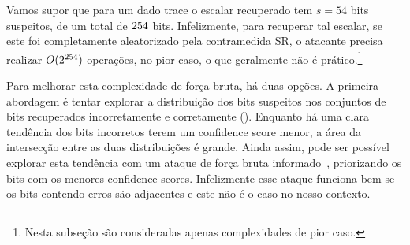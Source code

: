 Vamos supor que para um dado trace o escalar recuperado tem $s=54$ bits suspeitos, de um total de $254$ bits.
Infelizmente, para recuperar tal escalar, se este foi completamente aleatorizado pela contramedida SR, o atacante precisa realizar $O(2^{254})$ operações, no pior caso, o que geralmente não é prático.\footnote{Nesta subseção são consideradas apenas complexidades de pior caso.}


Para melhorar esta complexidade de força bruta, há duas opções.
A primeira abordagem é tentar explorar a distribuição dos bits suspeitos nos conjuntos de bits recuperados incorretamente e corretamente (). Enquanto há uma clara tendência dos bits incorretos terem um confidence score menor, a área da intersecção entre as duas distribuições é grande.
Ainda assim, pode ser possível explorar esta tendência com um ataque de força bruta informado~\cite{LangeVredendaalWakker2014}, priorizando os bits com os menores confidence scores.
Infelizmente esse ataque funciona bem se os bits contendo erros são adjacentes e este não é o caso no nosso contexto.

